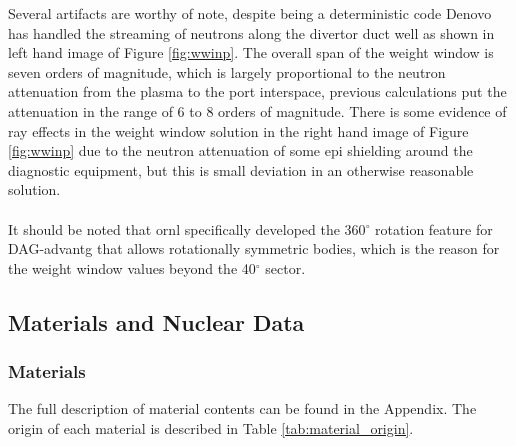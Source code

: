 \documentclass[12pt]{article}
\begin{document}
Several artifacts are worthy of note, despite being a deterministic code Denovo
has handled the streaming of neutrons along the divertor duct well as shown in
left hand image of Figure \ref{fig:wwinp}. The overall span of the weight window
is seven orders of magnitude, which is largely proportional to the neutron
attenuation from the plasma to the port interspace, previous calculations put
the attenuation in the range of 6 to 8 orders of magnitude. There is some
evidence of ray effects in the weight window solution in the right hand image
of Figure \ref{fig:wwinp} due to the neutron attenuation of some \gls{epi}
shielding around the diagnostic equipment, but this is small deviation in an
otherwise reasonable solution.
\\
\\
It should be noted that \gls{ornl} specifically developed the 360$^{\circ}$
rotation feature for DAG-\gls{advantg} that allows rotationally symmetric
bodies, which is the reason for the weight window values beyond the
40$^{\circ}$ sector.
\subsection{Materials and Nuclear Data}
\subsubsection{Materials}
The full description of material contents can be found in the Appendix. The 
origin of each material is described in Table \ref{tab:material_origin}. 
\end{document}
